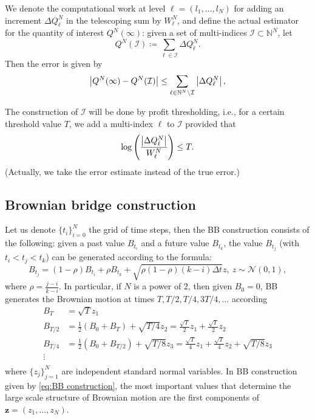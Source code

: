 \documentclass[11pt]{article}
\newcommand{\COMMA}{,}
\begin{document}
We denote the computational work at level $\ell = (l_1, \ldots, l_{N})$  for adding an increment $\Delta Q^N_{\ell}$
in the telescoping sum by  $W^N_\ell$, and   define the actual estimator for the quantity of interest
$Q^N(\infty)$: given a set of multi-indices $\mathcal{I} \subset
\mathbb{N}^{N}$, let
\begin{equation*}
	Q^N(\mathcal{I}) \coloneqq \sum_{\ell \in \mathcal{I}} \Delta Q^N_\ell.
\end{equation*}
Then the error is given by
\begin{equation*}
	\left\lvert Q^N(\infty) - Q^N(\mathcal{I})\right\rvert \le \sum_{\ell \in \mathbb{N}^{N} \setminus
		\mathcal{I}} \left\lvert\Delta Q^N_\ell\right\rvert,
\end{equation*}


The construction of $\mathcal{I}$ will be done by profit thresholding, i.e.,
for a certain threshold value $T$, we add a multi-index $\ell$ to
$\mathcal{I}$ provided that
\begin{equation*}
	\log\left( \frac{\left\lvert\Delta Q^N_\ell\right\rvert}{W_\ell^N} \right) \le T.
\end{equation*}
(Actually, we take the error estimate instead of the true error.)



\subsection{Brownian bridge construction}\label{sec:Brwonian bridge construction}

Let us denote $\{t_i\}_{i=0}^{N}$ the grid of time steps, then the BB construction \cite{glasserman2004monte} consists of the following: given a past value $B_{t_i}$ and a future value $B_{t_k}$, the value $B_{t_j}$ (with $t_i < t_j < t_k$) can be generated according to the formula:
\begin{equation}
B_{t_j}=(1-\rho) B_{t_i}+\rho B_{t_k}+ \sqrt{\rho (1-\rho)(k-i) \Delta t} z, \: z \sim \mathcal{N}(0,1) \COMMA
\end{equation}
where $\rho=\frac{j-i}{k-i}$.  In particular, if $N$ is a power of $2$, then given $B_0=0$, BB generates the Brownian motion at times $T, T/2,T/4,3T/4,\dots$ according
\begin{align}\label{eq:BB construction}
	B_T&=\sqrt{T}z_1\nonumber\\
	B_{T/2}&= \frac{1}{2}(B_{0}+B_{T})+\sqrt{T/4}z_2= \frac{\sqrt{T}}{2} z_1+\frac{\sqrt{T}}{2} z_2\nonumber\\
	B_{T/4}&=\frac{1}{2} (B_{0}+B_{T/2})+\sqrt{T/8}z_3= \frac{\sqrt{T}}{4} z_1+\frac{\sqrt{T}}{4} z_2+\sqrt{T/8}z_3\nonumber\\
	\vdots \nonumber\\
\end{align}
where $\{z_j\}_{j=1}^{N}$ are independent standard normal variables.  In BB construction given by \eqref{eq:BB construction}, the most important values that determine the large scale structure of Brownian motion are the first components of $\mathbf{z} = (z_1,\dots,z_N)$.
\end{document}
